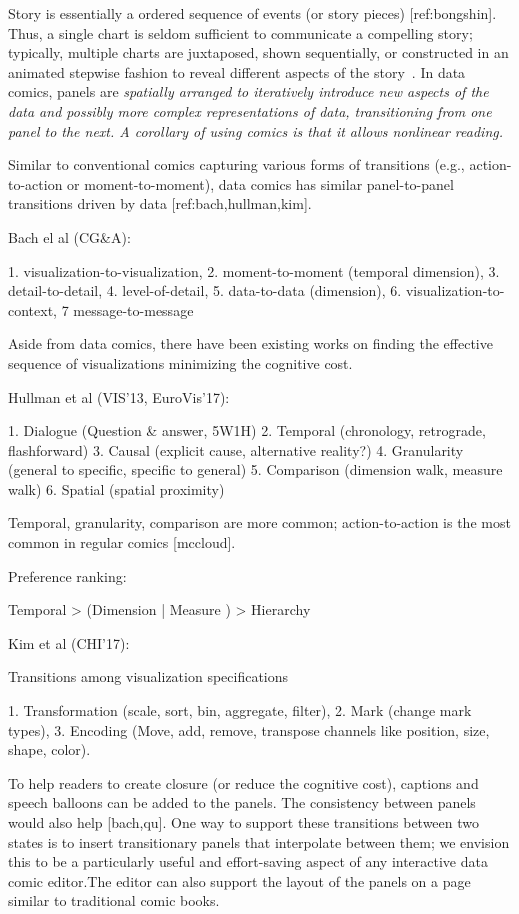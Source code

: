 
Story is essentially a ordered sequence of events (or story pieces) [ref:bongshin]. Thus, a single chart is seldom sufficient to communicate a compelling story; typically, multiple charts are juxtaposed, shown sequentially, or constructed in an animated stepwise fashion to reveal different aspects of the story~\cite{amini2017authoring,hullman2013deeper,satyanarayan2014authoring}. In data comics, panels are \it{spatially} arranged to iteratively introduce new aspects of the data and possibly more complex representations of data, transitioning from one panel to the next. A corollary of using comics is that it allows nonlinear reading.

Similar to conventional comics capturing various forms of transitions (e.g., action-to-action or moment-to-moment), data comics has similar panel-to-panel transitions driven by data [ref:bach,hullman,kim].

Bach el al (CG\&A):

1. visualization-to-visualization, 2. moment-to-moment (temporal dimension), 3. detail-to-detail, 4. level-of-detail, 5. data-to-data (dimension), 6. visualization-to-context, 7 message-to-message

Aside from data comics, there have been existing works on finding the effective sequence of visualizations minimizing the cognitive cost.

Hullman et al (VIS'13, EuroVis'17):

1. Dialogue (Question \& answer, 5W1H)
2. Temporal (chronology, retrograde, flashforward)
3. Causal (explicit cause, alternative reality?)
4. Granularity (general to specific, specific to general)
5. Comparison (dimension walk, measure walk)
6. Spatial (spatial proximity)

Temporal, granularity, comparison are more common; action-to-action is the most common in regular comics [mccloud].

Preference ranking: 

Temporal > (Dimension | Measure ) > Hierarchy

Kim et al (CHI'17):

Transitions among visualization specifications

1. Transformation (scale, sort, bin, aggregate, filter), 2. Mark (change mark types), 3. Encoding (Move, add, remove, transpose channels like position, size, shape, color).

To help readers to create closure (or reduce the cognitive cost), captions and speech balloons can be added to the panels. The consistency between panels would also help [bach,qu]. One way to support these transitions between two states is to insert transitionary panels that interpolate between them; we envision this to be a particularly useful and effort-saving aspect of any interactive data comic editor.The editor can also support the layout of the panels on a page similar to traditional comic books.


